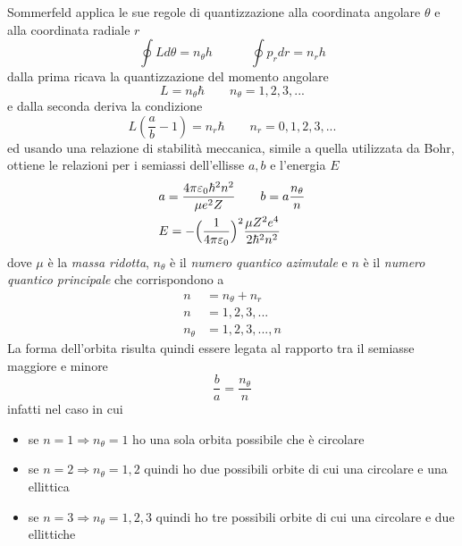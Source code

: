 Sommerfeld applica le sue regole di quantizzazione alla coordinata angolare $\theta$ e alla coordinata radiale $r$
\begin{equation}
\oint L d\theta = n_{\theta} h \quad\quad \quad \oint p_r dr = n_r h
\end{equation}
dalla prima ricava la quantizzazione del momento angolare
\begin{equation}
L = n_{\theta} \hbar \quad\quad n_{\theta} = 1,2,3, ...
\end{equation}
e dalla seconda deriva la condizione
\begin{equation}
L (\frac{ a}{b } - 1) = n_r \hbar \quad\quad n_{r} = 0,1,2,3, ...
\end{equation}
ed usando una relazione di stabilità meccanica, simile a quella utilizzata da Bohr, ottiene le relazioni per i semiassi dell'ellisse $a, b$ e l'energia $E$
\begin{equation}
\begin{split}
& a = \frac{ 4\pi \varepsilon_0 \hbar^2 n^2}{\mu e^2 Z } \quad\quad b = a \frac{ n_{\theta}}{n } \\
& E = - \Bigl(  \frac{ 1}{4\pi\varepsilon_0 }  \Bigr)^2 \frac{ \mu Z^2 e^4}{2 \hbar^2 n^2 }
\end{split}
\end{equation}
dove $\mu$ è la \textit{massa ridotta}, $n_{\theta}$ è il \textit{numero quantico azimutale} e $n$ è il \textit{numero quantico principale} che corrispondono a
\begin{equation}
\begin{split}
n & = n_{\theta} + n_{r} \\
n & = 1,2,3,... \\
n_{\theta} & = 1,2,3,..., n
\end{split}
\end{equation}
La forma dell'orbita risulta quindi essere legata al rapporto tra il semiasse maggiore e minore
\begin{equation}
\frac{ b}{a } = \frac{ n_{\theta}}{n }
\end{equation}
infatti nel caso in cui
\begin{itemize}
\item se $n=1 \Rightarrow n_{\theta}=1$ ho una sola orbita possibile che è circolare
\item se $n=2 \Rightarrow n_{\theta}=1,2$ quindi ho due possibili orbite di cui una circolare e una ellittica
\item se $n=3 \Rightarrow n_{\theta}=1,2,3$ quindi ho tre possibili orbite di cui una circolare e due ellittiche
\end{itemize}

